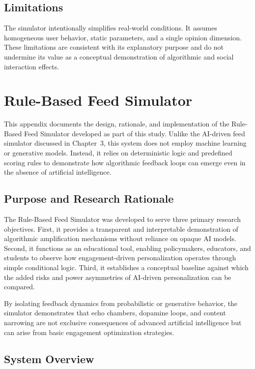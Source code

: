 \documentclass[12pt,a4paper]{report}
\begin{document}
\section{Limitations}

The simulator intentionally simplifies real-world conditions. It assumes homogeneous user behavior, static parameters, and a single opinion dimension. These limitations are consistent with its explanatory purpose and do not undermine its value as a conceptual demonstration of algorithmic and social interaction effects.


\chapter{Rule-Based Feed Simulator}
\label{app:rule_based_simulator}

This appendix documents the design, rationale, and implementation of the Rule-Based Feed Simulator developed as part of this study. Unlike the AI-driven feed simulator discussed in Chapter~3, this system does not employ machine learning or generative models. Instead, it relies on deterministic logic and predefined scoring rules to demonstrate how algorithmic feedback loops can emerge even in the absence of artificial intelligence.

\section{Purpose and Research Rationale}

The Rule-Based Feed Simulator was developed to serve three primary research objectives. First, it provides a transparent and interpretable demonstration of algorithmic amplification mechanisms without reliance on opaque AI models. Second, it functions as an educational tool, enabling policymakers, educators, and students to observe how engagement-driven personalization operates through simple conditional logic. Third, it establishes a conceptual baseline against which the added risks and power asymmetries of AI-driven personalization can be compared.

By isolating feedback dynamics from probabilistic or generative behavior, the simulator demonstrates that echo chambers, dopamine loops, and content narrowing are not exclusive consequences of advanced artificial intelligence but can arise from basic engagement optimization strategies.

\section{System Overview}
\end{document}
